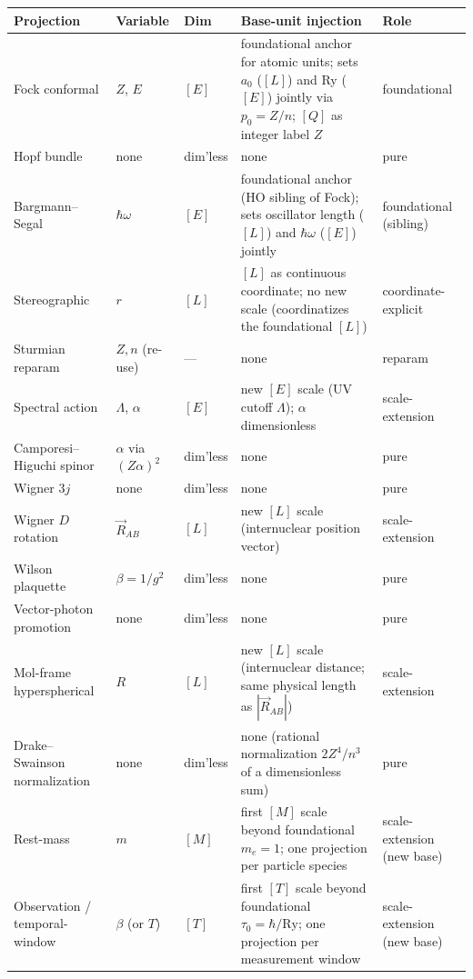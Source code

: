 \documentclass[11pt]{article}
\begin{document}
\begin{table}[h]
\centering\small
\begin{tabular}{p{3cm} p{2.2cm} p{0.9cm} p{4.5cm} p{1.6cm}}
\toprule
Projection & Variable & Dim & Base-unit injection & Role \\
\midrule
Fock conformal & $Z$, $E$ & $[E]$ &
foundational anchor for atomic units; sets $a_0$ ($[L]$) and Ry
($[E]$) jointly via $p_0 = Z/n$; $[Q]$ as integer label $Z$ &
foundational \\
Hopf bundle & none & dim'less & none & pure \\
Bargmann--Segal & $\hbar\omega$ & $[E]$ &
foundational anchor (HO sibling of Fock); sets oscillator length
($[L]$) and $\hbar\omega$ ($[E]$) jointly &
foundational (sibling) \\
Stereographic & $r$ & $[L]$ & $[L]$ as continuous coordinate; no new
scale (coordinatizes the foundational $[L]$) &
coordinate-explicit \\
Sturmian reparam & $Z, n$ (re-use) & --- & none & reparam \\
Spectral action & $\Lambda$, $\alpha$ & $[E]$ & new $[E]$ scale (UV
cutoff $\Lambda$); $\alpha$ dimensionless & scale-extension \\
Camporesi--Higuchi spinor & $\alpha$ via $(Z\alpha)^2$ & dim'less &
none & pure \\
Wigner $3j$ & none & dim'less & none & pure \\
Wigner $D$ rotation & $\vec{R}_{AB}$ & $[L]$ & new $[L]$ scale
(internuclear position vector) & scale-extension \\
Wilson plaquette & $\beta = 1/g^2$ & dim'less & none & pure \\
Vector-photon promotion & none & dim'less & none & pure \\
Mol-frame hyperspherical & $R$ & $[L]$ & new $[L]$ scale
(internuclear distance; same physical length as $|\vec{R}_{AB}|$) &
scale-extension \\
Drake--Swainson normalization & none & dim'less & none (rational
normalization $2Z^4/n^3$ of a dimensionless sum) & pure \\
Rest-mass & $m$ & $[M]$ & first $[M]$ scale beyond foundational
$m_e = 1$; one projection per particle species &
scale-extension (new base) \\
Observation / temporal-window & $\beta$ (or $T$) & $[T]$ & first
$[T]$ scale beyond foundational $\tau_0 = \hbar/\mathrm{Ry}$; one
projection per measurement window &
scale-extension (new base) \\

\end{tabular}
\end{table}
\end{document}
